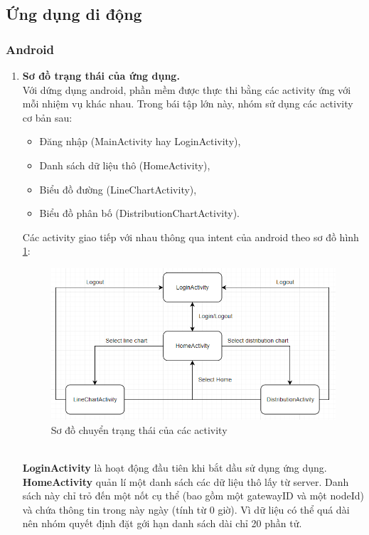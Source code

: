 \documentclass[a4paper]{article}
\begin{document}
	\subsection{Ứng dụng di động}
		\subsubsection{Android}
		\begin{enumerate}
		\item \textbf{ Sơ đồ trạng thái của ứng dụng.}\\
			Với dứng dụng android, phần mềm được thực thi bằng các activity ứng với mỗi nhiệm vụ khác nhau. Trong bái tập lớn 			này, nhóm sử dụng các activity cơ bản sau:
 			\begin{itemize} 
				\item Đăng nhập (MainActivity hay LoginActivity), 
				\item Danh sách dữ liệu thô (HomeActivity),
				\item Biểu đồ đường (LineChartActivity),
				\item Biểu đồ phân bố (DistributionChartActivity).
			\end{itemize} 
			Các activity giao tiếp với nhau thông qua intent của android theo sơ đồ hình \ref{fig:sateDiagramApp}:\\
			\begin{figure}[htp]
	    			\centering
	   			 \includegraphics[scale=0.75]{StateDiagramApp.PNG}
	   			 \caption{Sơ đồ chuyển trạng thái của các activity}
	   			 \label{fig:sateDiagramApp}
			\end{figure}\\
			\textbf{LoginActivity} là hoạt động đầu tiên khi bắt dầu sử dụng ứng dụng.\\
			\textbf{HomeActivity} quản lí một danh sách các dữ liệu thô lấy từ server. Danh sách này chỉ trỏ đến một nốt cụ thể 				(bao gồm một gatewayID và một nodeId) và chứa thông tin trong này ngày (tính từ 0 giờ). Vì dữ liệu có thể quá dài 				nên nhóm quyết định đặt gới hạn danh sách dài chỉ 20 phần tử.\\	

\end{enumerate}
\end{document}
